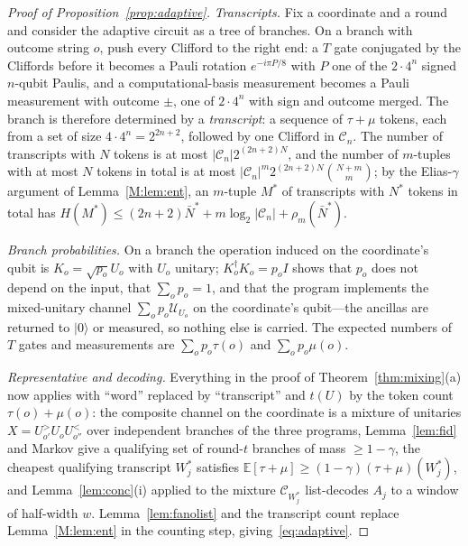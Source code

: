 \documentclass[aps,prx,twocolumn,superscriptaddress,nofootinbib,longbibliography]{revtex4-2}
\theoremstyle{plain}
\theoremstyle{definition}
\theoremstyle{remark}
\newcommand{\E}{\mathbb{E}}
\begin{document}
\begin{proof}[Proof of Proposition~\ref{prop:adaptive}]
\emph{Transcripts.} Fix a coordinate and a round and consider the adaptive circuit as a tree of branches. On a branch with outcome string $o$, push every Clifford to the right end: a $T$ gate conjugated by the Cliffords before it becomes a Pauli rotation $e^{-i\pi P/8}$ with $P$ one of the $2\cdot4^n$ signed $n$-qubit Paulis, and a computational-basis measurement becomes a Pauli measurement with outcome $\pm$, one of $2\cdot4^n$ with sign and outcome merged. The branch is therefore determined by a \emph{transcript}: a sequence of $\tau+\mu$ tokens, each from a set of size $4\cdot4^n=2^{2n+2}$, followed by one Clifford in $\mathcal C_n$. The number of transcripts with $N$ tokens is at most $|\mathcal C_n|2^{(2n+2)N}$, and the number of $m$-tuples with at most $N$ tokens in total is at most $|\mathcal C_n|^m2^{(2n+2)N}\binom{N+m}m$; by the Elias-$\gamma$ argument of Lemma~\ref{M:lem:ent}, an $m$-tuple $M^*$ of transcripts with $N^*$ tokens in total has $H(M^*)\le(2n+2)\bar N^*+m\log_2|\mathcal C_n|+\rho_m(\bar N^*)$.

\emph{Branch probabilities.} On a branch the operation induced on the coordinate's qubit is $K_o=\sqrt{p_o}U_o$ with $U_o$ unitary; $K_o^\dagger K_o=p_oI$ shows that $p_o$ does not depend on the input, that $\sum_op_o=1$, and that the program implements the mixed-unitary channel $\sum_op_o\mathcal U_{U_o}$ on the coordinate's qubit---the ancillas are returned to $|0\rangle$ or measured, so nothing else is carried. The expected numbers of $T$ gates and measurements are $\sum_op_o\tau(o)$ and $\sum_op_o\mu(o)$.

\emph{Representative and decoding.} Everything in the proof of Theorem~\ref{thm:mixing}(a) now applies with ``word'' replaced by ``transcript'' and $t(U)$ by the token count $\tau(o)+\mu(o)$: the composite channel on the coordinate is a mixture of unitaries $X=U^>_{o'}U_oU^<_{o''}$ over independent branches of the three programs, Lemma~\ref{lem:fid} and Markov give a qualifying set of round-$t$ branches of mass $\ge1-\gamma$, the cheapest qualifying transcript $W^*_j$ satisfies $\E[\tau+\mu]\ge(1-\gamma)(\tau+\mu)(W^*_j)$, and Lemma~\ref{lem:conc}(i) applied to the mixture $\mathcal C_{W^*_j}$ list-decodes $A_j$ to a window of half-width $w$. Lemma~\ref{lem:fanolist} and the transcript count replace Lemma~\ref{M:lem:ent} in the counting step, giving~\eqref{eq:adaptive}.
\end{proof}
\end{document}
